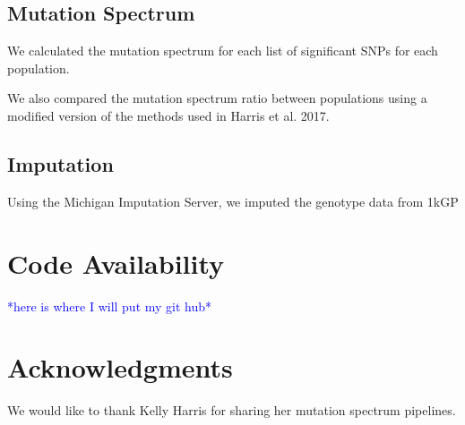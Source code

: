 \documentclass[9pt,lineno]{elife}
\newcommand{\todo}[1]{\textcolor{blue}{*#1*}}
\begin{document}
\subsection{Mutation Spectrum}
We calculated the mutation spectrum for each list of significant SNPs for each population.  

We also compared the mutation spectrum ratio between populations using a modified version of the methods used in Harris et al. 2017. 

\subsection{Imputation}
Using the Michigan Imputation Server, we imputed the genotype data from 1kGP


\section{Code Availability}
\todo{here is where I will put my git hub}

\section{Acknowledgments}
We would like to thank Kelly Harris for sharing her mutation spectrum pipelines.
  
\end{document}
